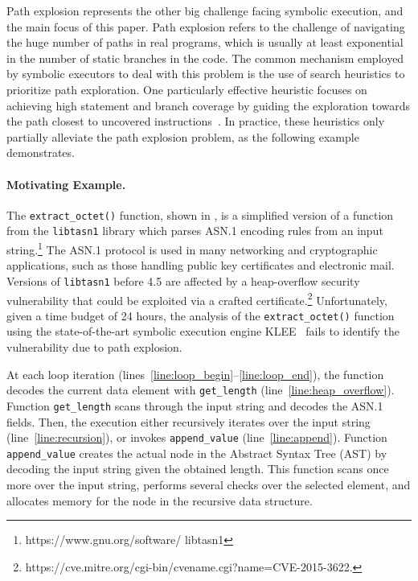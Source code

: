 Path explosion represents the other big challenge facing symbolic
execution, and the main focus of this paper.  Path explosion refers to
the challenge of navigating the huge number of paths in real programs,
which is usually at least exponential in the number of static branches
in the code. The common mechanism employed by symbolic executors to
deal with this problem is the use of search heuristics to prioritize
path exploration. One particularly effective heuristic focuses on
achieving high statement and branch coverage by guiding the
exploration towards the path closest to uncovered
instructions~\cite{exe,klee,sen:concolicheuristics,fitsymex:dsn09}.
In practice, these heuristics only partially alleviate the path
explosion problem, as the following example demonstrates.

\paragraph{Motivating Example.}
The \texttt{extract\_octet()} function, shown in
, is a simplified version of a function from
the \texttt{libtasn1} library which parses ASN.1 encoding
rules from an input string.\footnote{https://www.gnu.org/software/
  libtasn1} The ASN.1 protocol is used in many networking and
cryptographic applications, such as those handling public key
certificates and electronic mail.  Versions of \texttt{libtasn1} before
4.5 are affected by a heap-overflow security vulnerability that could
be exploited via a crafted
certificate.\footnote{https://cve.mitre.org/cgi-bin/cvename.cgi?name=CVE-2015-3622.}
Unfortunately, given a time budget of 24 hours, the analysis of the
\texttt{extract\_octet()} function using the state-of-the-art symbolic
execution engine KLEE~\cite{klee} fails to identify the vulnerability
due to path explosion.

At each loop iteration
(lines~\ref{line:loop_begin}--\ref{line:loop_end}), the function
decodes the current data element with \texttt{get\_length}
(line~\ref{line:heap_overflow}). Function \texttt{get\_length} scans
through the input string and decodes the ASN.1 fields. Then, the
execution either recursively iterates over the input string
(line~\ref{line:recursion}), or invokes \texttt{append\_value}
(line~\ref{line:append}). Function \texttt{append\_value} creates the
actual node in the Abstract Syntax Tree (AST) by decoding the input
string given the obtained length. This function scans once more over
the input string, performs several checks over the selected element,
and allocates memory for the node in the recursive data structure.

